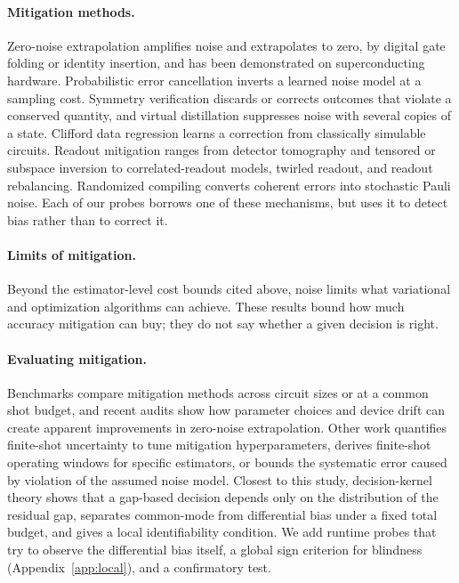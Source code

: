 \documentclass[10pt,twocolumn]{article}
\begin{document}
\paragraph{Mitigation methods.} Zero-noise extrapolation amplifies noise and
extrapolates to zero\cite{temme2017,li2017}, by digital gate
folding\cite{giurgica2020} or identity insertion\cite{he2020}, and has been
demonstrated on superconducting
hardware\cite{kandala2019,kim2023natphys,kim2023}. Probabilistic error
cancellation inverts a learned noise model at a sampling
cost\cite{temme2017,endo2018,vandenberg2023}. Symmetry verification discards
or corrects outcomes that violate a conserved
quantity\cite{bonetmonroig2018,mcardle2019,sagastizabal2019}, and virtual
distillation suppresses noise with several copies of a state\cite{huggins2021}.
Clifford data regression learns a correction from classically simulable
circuits\cite{czarnik2021,lowe2021,strikis2021}. Readout mitigation ranges from
detector tomography\cite{maciejewski2020,chen2019detector} and tensored or
subspace inversion\cite{bravyi2021,nation2021} to correlated-readout
models\cite{maciejewski2021}, twirled readout\cite{vandenberg2022trex}, and
readout rebalancing\cite{hicks2021}. Randomized compiling converts coherent
errors into stochastic Pauli
noise\cite{knill2005,wallman2016,hashim2021}. Each of our probes borrows one of
these mechanisms, but uses it to detect bias rather than to correct it.

\paragraph{Limits of mitigation.} Beyond the estimator-level cost bounds cited
above\cite{takagi2022,takagi2023,tsubouchi2023,quek2024}, noise limits what
variational and optimization algorithms can
achieve\cite{stilckfranca2021,wang2021nibp}. These results bound how much
accuracy mitigation can buy; they do not say whether a given decision is
right.

\paragraph{Evaluating mitigation.} Benchmarks compare mitigation methods across
circuit sizes\cite{cirstoiu2023} or at a common shot budget\cite{bultrini2023},
and recent audits show how parameter choices and device drift can create
apparent improvements in zero-noise
extrapolation\cite{koster2026,koster2026claim}. Other work quantifies
finite-shot uncertainty to tune mitigation
hyperparameters\cite{prodius2026}, derives finite-shot operating windows for
specific estimators\cite{scavino2026pec,scavinoalfaro2026windows}, or bounds
the systematic error caused by violation of the assumed noise
model\cite{govia2025}. Closest to this study, decision-kernel theory shows
that a gap-based decision depends only on the distribution of the residual
gap, separates common-mode from differential bias under a fixed total budget,
and gives a local identifiability condition\cite{scavino2026}. We add runtime
probes that try to observe the differential bias itself, a global sign
criterion for blindness (Appendix~\ref{app:local}), and a confirmatory test.
\end{document}
